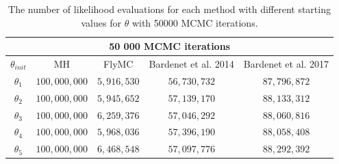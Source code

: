  \begin{table}[ht]
    \centering
\begin{tabular}{|c|c|c|c|c|}
  \hline
    \multicolumn{5}{|c|}{50 000 MCMC iterations} \\
    \hline
\hline
        $\theta_{init}$ &  MH & FlyMC & Bardenet et al. 2014 & Bardenet et al. 2017\\ 
         \hline \hline$\theta_1$ & $100,000,000$ & $5,916,530$ & $56,730,732$ & $87,796,872$ \\
        $\theta_2$ & $100,000,000$ & $5,945,652$ & $57,139,170$ & $88,133,312$ \\
        $\theta_3$ & $100,000,000$ & $6,259,376$ & $57,046,292$ & $88,060,816$
        \\ $ \theta_4$ & $100,000,000$ & $5,968,036$ & $57,396,190$ & $88,058,408$ \\
        $\theta_5$ &$100,000,000$&$6,468,548$&$57,097,776$&$88,292,392$
        \\ \hline
\end{tabular}
\caption{The number of likelihood evaluations for each method with different starting values for $\theta$ with 50000 MCMC iterations.}
\label{tab:ll_evals_50k_normal}
\end{table} 

